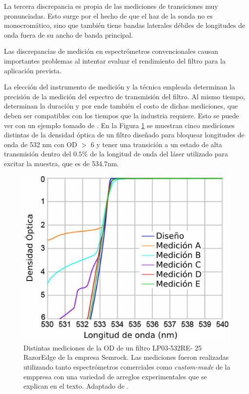 \documentclass{ctuthesis}
\begin{document}
La tercera 
discrepancia es propia de las mediciones de transiciones muy 
pronunciadas. Esto surge 
por el hecho de que el 
haz de la sonda no es monocromático, sino que también tiene bandas 
laterales débiles de longitudes de onda fuera de su ancho de banda 
principal.

Las discrepancias de medición en espectrómetros convencionales 
causan 
importantes problemas al intentar evaluar el rendimiento del filtro para la 
aplicación prevista. 

La elección del instrumento de medición y la técnica 
empleada determinan la precisión de la medición del espectro de transmisión del 
filtro. Al mismo tiempo, determinan la duración y por ende también el costo de 
dichas mediciones, que deben ser compatibles con los tiempos que la industria 
requiere. Esto se puede ver con un ejemplo tomado de \cite{Semrock}. En la 
Figura \ref{fig:may_dists} se muestran cinco mediciones distintas de 
la densidad óptica de un filtro diseñado para bloquear longitudes de onda de 
532 nm con OD $>$ 6 y tener una transición a un estado de alta transmisión 
dentro del $0.5\%$ de la longitud de onda del láser utilizado para excitar la 
muestra, que es de 534.7nm.


\begin{figure}[H]
	\centering
	\includegraphics[scale=0.8]{Figs/plan_de_tesis/dists_meds.png}
	\caption{Distintas mediciones de la OD de un filtro LP03-532RE-
		25 RazorEdge de la empresa Semrock. Las mediciones fueron realizadas 
		utilizando tanto espectrómetros comerciales como \textit{custom-made} 
		de la emppresa con una variedad de arreglos experimentales que se 
		explican en el texto. Adaptado de 
		\cite{Semrock}.}
	\label{fig:may_dists}
\end{figure}
\end{document}
